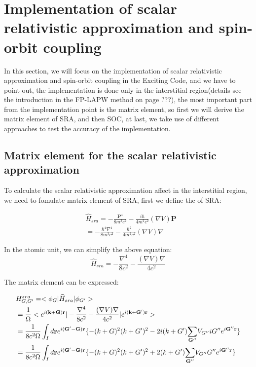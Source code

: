 \documentclass[a4paper]{report}
\begin{document}
\section{Implementation of scalar relativistic approximation and spin-orbit coupling}
\noindent In this section, we will focus on the implementation of scalar relativistic approximation and spin-orbit coupling in the Exciting Code,
and we have to point out, the implementation is done only in the interstitial region(details see the introduction in the FP-LAPW method on page ???), 
the most important part from the  implementation point is the matrix element, so first we will derive the matrix element of SRA, and then SOC, at last,
we take use of different approaches to test the accuracy of the implementation.

\subsection{Matrix element for the scalar relativistic approximation }
\noindent To calculate the scalar relativistic approximation affect in the interstitial region, we need to fomulate matrix element of SRA, first we define the \hm  of SRA:

\begin{equation}
\begin{split}
 & \widehat{H}_{sra} = - \frac{\textbf{P}^4}{8 {m}^3 {c}^2} -\frac{i\hbar}{4{m}^2 {c}^2} (\nabla{V})\textbf{P} \\
 & = -\frac{\hbar^4 \nabla^4}{8{m}^3 {c}^2} - \frac{\hbar^2}{4m^2c^2}(\nabla{V})\nabla
\end{split}
\end{equation}

\noindent In the atomic unit, we can simplify the above equation:
\begin{equation}
  \widehat{H}_{sra} =  -\frac{\nabla^4}{8 {c}^2} - \frac{(\nabla{V})\nabla}{4 c^2}
\end{equation}

\noindent The matrix element can be expressed:

\begin{equation}
\begin{split}
& H_{G,G'}^{sra} = < \phi_G | \widehat{H}_{sra}  | \phi_{G'} >  \\
&  = \frac{1}{\Omega} < \expg<(k+G)> |  -\frac{\nabla^4}{8 {c}^2} - \frac{(\nabla{V})\nabla}{4 c^2} |  \expg<(k+G')>>  \\
&  = \frac{1}{8 {c}^2 \Omega} \int_{I} d \textbf {r} \expg<(G'-G)> \{-(k+G)^2(k+G')^2 -2i(k+G') \sumg<G''> V_{G''}iG'' \expg<G''>\}  \\
&  =  \frac{1}{8 {c}^2 \Omega} \int_{I} d \textbf {r} \expg<(G'-G)> \{-(k+G)^2(k+G')^2 + 2(k+G') \sumg<G''> V_{G''}G'' \expg<G''>\}  
\end{split}
\end{equation}
\end{document}
